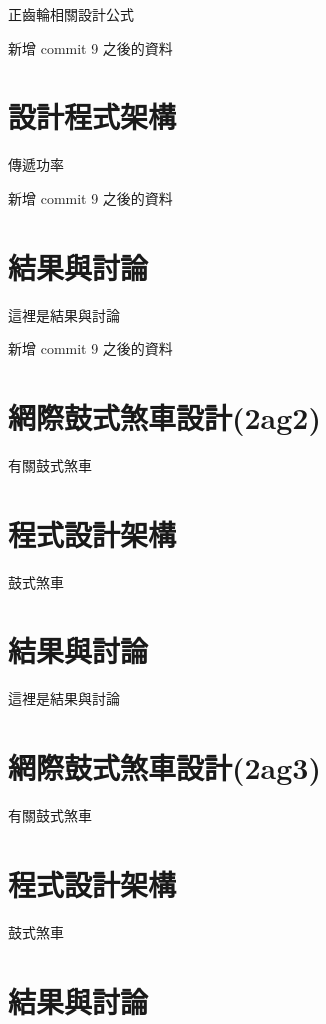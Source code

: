 \documentclass[]{article}
\begin{document}
正齒輪相關設計公式

新增 commit 9 之後的資料

\section{設計程式架構}\label{ux8a2dux8a08ux7a0bux5f0fux67b6ux69cb}

傳遞功率

新增 commit 9 之後的資料

\section{結果與討論}\label{ux7d50ux679cux8207ux8a0eux8ad6}

這裡是結果與討論

新增 commit 9 之後的資料

\section{網際鼓式煞車設計(2ag2)}\label{ux7db2ux969bux9f13ux5f0fux715eux8ecaux8a2dux8a082ag2}

有關鼓式煞車

\section{程式設計架構}\label{ux7a0bux5f0fux8a2dux8a08ux67b6ux69cb}

鼓式煞車

\section{結果與討論}\label{ux7d50ux679cux8207ux8a0eux8ad6-1}

這裡是結果與討論

\section{網際鼓式煞車設計(2ag3)}\label{ux7db2ux969bux9f13ux5f0fux715eux8ecaux8a2dux8a082ag3}

有關鼓式煞車

\section{程式設計架構}\label{ux7a0bux5f0fux8a2dux8a08ux67b6ux69cb-1}

鼓式煞車

\section{結果與討論}\label{ux7d50ux679cux8207ux8a0eux8ad6-2}
\end{document}
